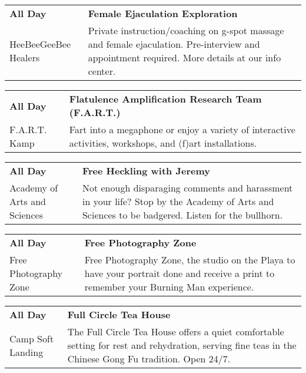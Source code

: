 \begin{tabular}{ p{1in} p{2.2in} }
    \textbf{All Day} & \textbf{Female Ejaculation Exploration} \\
    HeeBeeGeeBee Healers \newline  & Private instruction/coaching on g-spot massage and female ejaculation.  Pre-interview and appointment required.  More details at our info center. \\
    \hline 
\end{tabular}
    
\begin{tabular}{ p{1in} p{2.2in} }
    \textbf{All Day} & \textbf{Flatulence Amplification Research Team (F.A.R.T.) } \\
    F.A.R.T. Kamp \newline  & Fart into a megaphone or enjoy a variety of interactive activities, workshops, and (f)art installations. \\
    \hline 
\end{tabular}
    
\begin{tabular}{ p{1in} p{2.2in} }
    \textbf{All Day} & \textbf{Free Heckling with Jeremy} \\
    Academy of Arts and Sciences \newline  & Not enough disparaging comments and harassment in your life?  Stop by the Academy of Arts and Sciences to be badgered.  Listen for the bullhorn. \\
    \hline 
\end{tabular}
    
\begin{tabular}{ p{1in} p{2.2in} }
    \textbf{All Day} & \textbf{Free Photography Zone} \\
    Free Photography Zone \newline  & Free Photography Zone, the studio on the Playa to have your portrait done and receive a print to remember your Burning Man experience. \\
    \hline 
\end{tabular}
    
\begin{tabular}{ p{1in} p{2.2in} }
    \textbf{All Day} & \textbf{Full Circle Tea House} \\
    Camp Soft Landing \newline  & The Full Circle Tea House offers a quiet comfortable setting for rest and rehydration, serving fine teas in the Chinese Gong Fu tradition. Open 24/7. \\
    \hline 
\end{tabular}
    
